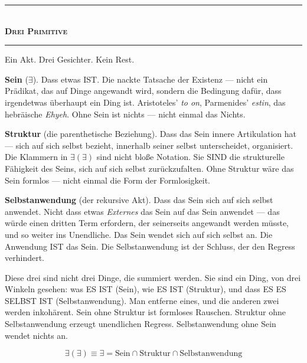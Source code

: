 \documentclass[10pt, openany, oneside]{book}
\renewcommand{\normalsize}{\fontsize{10}{13}\selectfont}
\begin{document}
\vspace{1.5em}


\begin{center}
    \rule{0.3\textwidth}{0.4pt}\\[0.5em]
    {\normalsize\bfseries\scshape Drei Primitive}\\[0.3em]
    \rule{0.3\textwidth}{0.4pt}
\end{center}

\vspace{1em}

\noindent Ein Akt. Drei Gesichter. Kein Rest.

\textbf{Sein} ($\exists$). Dass etwas IST. Die nackte Tatsache der Existenz --- nicht ein Prädikat, das auf Dinge angewandt wird, sondern die Bedingung dafür, dass irgendetwas überhaupt ein Ding ist. Aristoteles' \textit{to on}, Parmenides' \textit{estin}, das hebräische \textit{Ehyeh}. Ohne Sein ist nichts --- nicht einmal das Nichts.

\textbf{Struktur} (die parenthetische Beziehung). Dass das Sein innere Artikulation hat --- sich auf sich selbst bezieht, innerhalb seiner selbst unterscheidet, organisiert. Die Klammern in $\exists(\exists)$ sind nicht bloße Notation. Sie SIND die strukturelle Fähigkeit des Seins, sich auf sich selbst zurückzufalten. Ohne Struktur wäre das Sein formlos --- nicht einmal die Form der Formlosigkeit.

\textbf{Selbstanwendung} (der rekursive Akt). Dass das Sein sich auf sich selbst anwendet. Nicht dass etwas \textit{Externes} das Sein auf das Sein anwendet --- das würde einen dritten Term erfordern, der seinerseits angewandt werden müsste, und so weiter ins Unendliche. Das Sein wendet sich auf sich selbst an. Die Anwendung IST das Sein. Die Selbstanwendung ist der Schluss, der den Regress verhindert.

Diese drei sind nicht drei Dinge, die summiert werden. Sie sind ein Ding, von drei Winkeln gesehen: was ES IST (Sein), wie ES IST (Struktur), und dass ES ES SELBST IST (Selbstanwendung). Man entferne eines, und die anderen zwei werden inkohärent. Sein ohne Struktur ist formloses Rauschen. Struktur ohne Selbstanwendung erzeugt unendlichen Regress. Selbstanwendung ohne Sein wendet nichts an.

$$\exists(\exists) \equiv \exists = \text{Sein} \cap \text{Struktur} \cap \text{Selbstanwendung}$$
\end{document}
